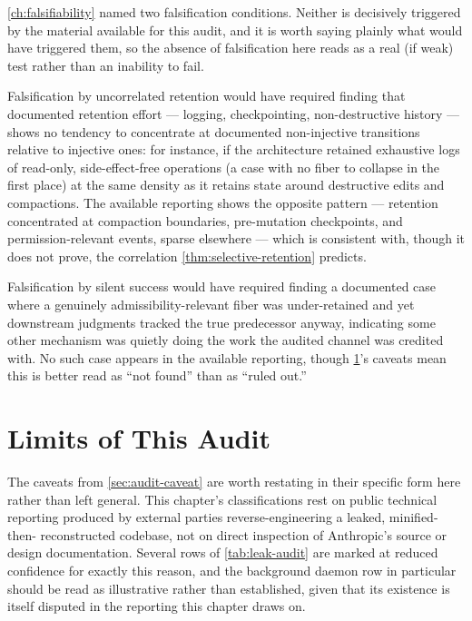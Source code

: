 \documentclass[11pt]{book}
\theoremstyle{plain}
\theoremstyle{definition}
\theoremstyle{remark}
\begin{document}
\cref{ch:falsifiability} named two falsification conditions. Neither
is decisively triggered by the material available for this audit, and
it is worth saying plainly what would have triggered them, so the
absence of falsification here reads as a real (if weak) test rather
than an inability to fail.

Falsification by uncorrelated retention would have required finding
that documented retention effort --- logging, checkpointing,
non-destructive history --- shows no tendency to concentrate at
documented non-injective transitions relative to injective ones: for
instance, if the architecture retained exhaustive logs of read-only,
side-effect-free operations (a case with no fiber to collapse in the
first place) at the same density as it retains state around
destructive edits and compactions. The available reporting shows the
opposite pattern --- retention concentrated at compaction boundaries,
pre-mutation checkpoints, and permission-relevant events, sparse
elsewhere --- which is consistent with, though it does not prove, the
correlation \cref{thm:selective-retention} predicts.

Falsification by silent success would have required finding a
documented case where a genuinely admissibility-relevant fiber was
under-retained and yet downstream judgments tracked the true
predecessor anyway, indicating some other mechanism was quietly doing
the work the audited channel was credited with. No such case appears
in the available reporting, though \cref{sec:leak-audit-limits}'s
caveats mean this is better read as \enquote{not found} than as
\enquote{ruled out.}

\section{Limits of This Audit}
\label{sec:leak-audit-limits}

The caveats from \cref{sec:audit-caveat} are worth restating in their
specific form here rather than left general. This chapter's
classifications rest on public technical reporting produced by
external parties reverse-engineering a leaked, minified-then-
reconstructed codebase, not on direct inspection of Anthropic's source
or design documentation. Several rows of \cref{tab:leak-audit} are
marked at reduced confidence for exactly this reason, and the
background daemon row in particular should be read as illustrative
rather than established, given that its existence is itself disputed
in the reporting this chapter draws on.
\end{document}
